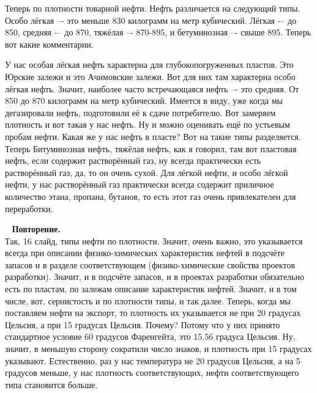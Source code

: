 \documentclass[main.tex]{subfiles}
\begin{document}
Теперь по плотности товарной нефти.
Нефть различается на следующий типы.
Особо лёгкая –- это меньше 830 килограмм на метр кубический.
Лёгкая -– до 850, средняя -– до 870, тяжёлая –- 870-895, и бетуминозная –- свыше 895.
Теперь вот какие комментарии.

У нас особая лёгкая нефть характерна для глубокопогруженных пластов.
Это Юрские залежи и это Ачимовские залежи.
Вот для них там характерна особо лёгкая нефть.
Значит, наиболее часто встречающаяся нефть –- это средняя.
От 850 до 870 килограмм на метр кубический.
Имеется в виду, уже когда мы дегазировали нефть, подготовили её к сдаче потребителю.
Вот замеряем плотность и вот такая у нас нефть.
Ну и можно оценивать ещё по устьевым пробам нефти.
Какая же у нас нефть в пласте?
Вот на такие типы разделяется.
Теперь Битуминозная нефть, тяжёлая нефть, как я говорил, там вот пластовая нефть, если содержит растворённый газ, ну всегда практически есть растворённый газ, да, то он очень сухой.
Для лёгкой нефти, и особо лёгкой нефти, у нас растворённый газ практически всегда содержит приличное количество этана, пропана, бутанов, то есть этот газ очень привлекателен для переработки.

\ \newline
\textbf{Повторение.}\\
Так, 16 слайд, типы нефти по плотности.
Значит, очень важно, это указывается всегда при описании физико-химических характеристик нефтей в подсчёте запасов и в разделе соответствующем (физико-химические свойства проектов разработки).
Значит, и в подсчёте запасов, и в проектах разработки обязательно есть по пластам, по залежам описание характеристик нефтей.
Значит, и в том числе, вот, сернистость и по плотности типы, и так далее.
Теперь, когда мы поставляем нефти на экспорт, то плотность их указывается не при 20 градусах Цельсия, а при 15 градусах Цельсия.
Почему?
Потому что у них принято стандартное условие 60 градусов Фаренгейта, это 15.56 градуса Цельсия.
Ну, значит, в меньшую сторону сократили число знаков, и плотность при 15 градусах указывают.
Естественно, раз у нас температура не 20 градусов Цельсия, а на 5 градусов меньше, у нас плотность соответствующих, нефти соответствующего типа становится больше.
\end{document}
